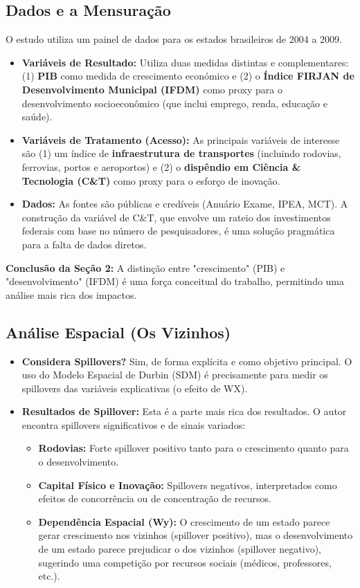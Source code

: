 \documentclass[12pt, a4paper]{article}
\begin{document}
\subsection{Dados e a Mensuração}
O estudo utiliza um painel de dados para os estados brasileiros de 2004 a 2009.
\begin{itemize}
    \item \textbf{Variáveis de Resultado:} Utiliza duas medidas distintas e complementares: (1) \textbf{PIB} como medida de crescimento económico e (2) o \textbf{Índice FIRJAN de Desenvolvimento Municipal (IFDM)} como proxy para o desenvolvimento socioeconômico (que inclui emprego, renda, educação e saúde).
    \item \textbf{Variáveis de Tratamento (Acesso):} As principais variáveis de interesse são (1) um índice de \textbf{infraestrutura de transportes} (incluindo rodovias, ferrovias, portos e aeroportos) e (2) o \textbf{dispêndio em Ciência \& Tecnologia (C\&T)} como proxy para o esforço de inovação.
    \item \textbf{Dados:} As fontes são públicas e credíveis (Anuário Exame, IPEA, MCT). A construção da variável de C\&T, que envolve um rateio dos investimentos federais com base no número de pesquisadores, é uma solução pragmática para a falta de dados diretos.
\end{itemize}

\noindent\textbf{Conclusão da Seção 2:} A distinção entre "crescimento" (PIB) e "desenvolvimento" (IFDM) é uma força conceitual do trabalho, permitindo uma análise mais rica dos impactos.

\subsection{Análise Espacial (Os Vizinhos)}

\begin{itemize}
    \item \textbf{Considera Spillovers?} Sim, de forma explícita e como objetivo principal. O uso do Modelo Espacial de Durbin (SDM) é precisamente para medir os spillovers das variáveis explicativas (o efeito de WX).
    \item \textbf{Resultados de Spillover:} Esta é a parte mais rica dos resultados. O autor encontra spillovers significativos e de sinais variados:
        \begin{itemize}
            \item \textbf{Rodovias:} Forte spillover positivo tanto para o crescimento quanto para o desenvolvimento.
            \item \textbf{Capital Físico e Inovação:} Spillovers negativos, interpretados como efeitos de concorrência ou de concentração de recursos.
            \item \textbf{Dependência Espacial (Wy):} O crescimento de um estado parece gerar crescimento nos vizinhos (spillover positivo), mas o desenvolvimento de um estado parece prejudicar o dos vizinhos (spillover negativo), sugerindo uma competição por recursos sociais (médicos, professores, etc.).
        \end{itemize}
\end{itemize}
\end{document}
